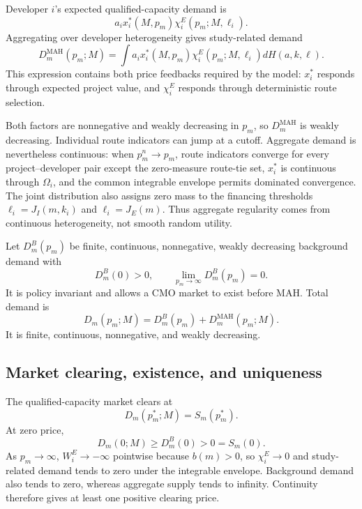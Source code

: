 Developer \(i\)'s expected qualified-capacity demand is
\[
  a_ix_i^*(M,p_m)\chi_i^E(p_m;M,\ell_i).
\]
Aggregating over developer heterogeneity gives study-related demand
\begin{equation}
  D_m^{\mathrm{MAH}}(p_m;M)
  =
  \int
  a_ix_i^*(M,p_m)\chi_i^E(p_m;M,\ell_i)
  dH(a,k,\ell).
  \label{eq:p06-study-demand}
\end{equation}
This expression contains both price feedbacks required by the model:
\(x_i^*\) responds through expected project value, and
\(\chi_i^E\) responds through deterministic route selection.

Both factors are nonnegative and weakly decreasing in \(p_m\), so
\(D_m^{\mathrm{MAH}}\) is weakly decreasing. Individual route indicators can
jump at a cutoff. Aggregate demand is nevertheless continuous: when
\(p_m^n\to p_m\), route indicators converge for every project--developer
pair except the zero-measure route-tie set, \(x_i^*\) is continuous through
\(\Omega_i\), and the common integrable envelope permits dominated
convergence. The joint distribution also assigns zero mass to the financing
thresholds \(\ell_i=J_I(m,k_i)\) and \(\ell_i=J_E(m)\). Thus aggregate
regularity comes from continuous heterogeneity, not smooth random utility.

Let \(D_m^B(p_m)\) be finite, continuous, nonnegative, weakly decreasing
background demand with
\[
  D_m^B(0)>0,
  \qquad
  \lim_{p_m\to\infty}D_m^B(p_m)=0.
\]
It is policy invariant and allows a CMO market to exist before MAH. Total
demand is
\begin{equation}
  D_m(p_m;M)
  =
  D_m^B(p_m)
  +
  D_m^{\mathrm{MAH}}(p_m;M).
  \label{eq:p06-total-demand}
\end{equation}
It is finite, continuous, nonnegative, and weakly decreasing.

\subsection{Market clearing, existence, and uniqueness}
\label{subsec:p06-clearing}

The qualified-capacity market clears at
\begin{equation}
  D_m(p_m^*;M)=S_m(p_m^*).
  \label{eq:p06-market-clearing}
\end{equation}
At zero price,
\begin{equation}
  D_m(0;M)\geq D_m^B(0)>0=S_m(0).
  \label{eq:p06-existence-boundaries}
\end{equation}
As \(p_m\to\infty\), \(W_i^E\to-\infty\) pointwise because
\(b(m)>0\), so \(\chi_i^E\to0\) and study-related demand tends to zero
under the integrable envelope. Background demand also tends to zero, whereas
aggregate supply tends to infinity. Continuity therefore gives at least one
positive clearing price.

